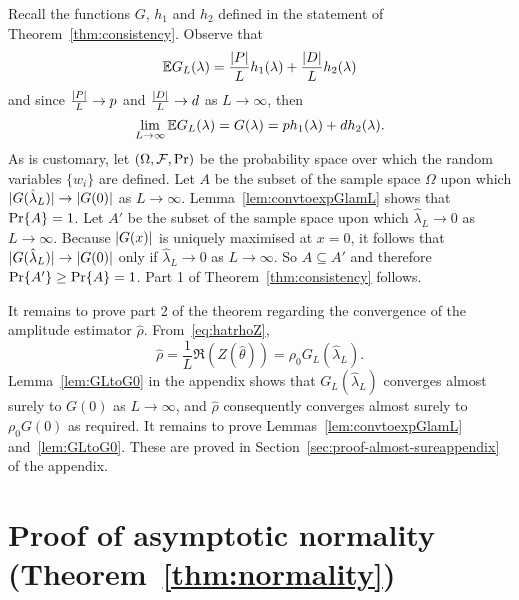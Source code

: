\documentclass[journal]{IEEEtran}
\begin{document}
Recall the functions $G$, $h_1$ and $h_2$ defined in the statement of Theorem~\ref{thm:consistency}.  Observe that
\[
{\mathbb E} G_L(\lambda) = \frac{{\left\vert P \right\vert}}{L} h_1(\lambda) + \frac{{\left\vert D \right\vert}}{L} h_2(\lambda)
\]
and since $\frac{{\left\vert P \right\vert}}{L} \rightarrow p$ and $\frac{{\left\vert D \right\vert}}{L} \rightarrow d$ as $L \rightarrow \infty$, then
\[
\lim_{L \rightarrow\infty} {\mathbb E} G_L(\lambda) = G(\lambda) = p h_1(\lambda)   +  d h_2(\lambda).
\]
As is customary, let $(\Omega, \mathcal F, {\operatorname{Pr}})$ be the probability space over which the random variables $\{w_i\}$ are defined.  Let $A$ be the subset of the sample space $\Omega$ upon which ${\vert G(\hat{\lambda}_L) \vert} \rightarrow {\vert G(0) \vert}$ as $L\rightarrow\infty$.  Lemma~\ref{lem:convtoexpGlamL} shows that ${\operatorname{Pr}}\{A\} = 1$.  Let $A'$ be the subset of the sample space upon which $\hat{\lambda}_L \rightarrow 0$ as $L\rightarrow \infty$.  Because ${\vert G(x) \vert}$ is uniquely maximised at $x=0$, it follows that ${\vert G(\hat{\lambda}_L) \vert} \rightarrow {\vert G(0) \vert}$ only if $\hat{\lambda}_L \rightarrow 0$ as $L \rightarrow\infty$. So $A \subseteq A'$ and therefore ${\operatorname{Pr}}\{A'\} \geq {\operatorname{Pr}}\{A\} = 1$.  Part 1 of Theorem~\ref{thm:consistency} follows.  

It remains to prove part 2 of the theorem regarding the convergence of the amplitude estimator $\hat{\rho}$.  From~\eqref{eq:hatrhoZ},
\begin{equation}\label{eq:rhoGLZ}
\hat{\rho} = \frac{1}{L}\Re(Z(\hat{\theta})) = \rho_0 G_L(\hat{\lambda}_L).
\end{equation}  
Lemma~\ref{lem:GLtoG0} in the appendix shows that $G_L(\hat{\lambda}_L)$ converges almost surely to $G(0)$ as $L\rightarrow\infty$, and $\hat{\rho}$ consequently converges almost surely to $\rho_0 G(0)$ as required.  It remains to prove Lemmas~\ref{lem:convtoexpGlamL} and~\ref{lem:GLtoG0}.  These are proved in Section~\ref{sec:proof-almost-sureappendix} of the appendix.

\section{Proof of asymptotic normality (Theorem~\ref{thm:normality}) } \label{sec:proof-asympt-norm}
\end{document}

